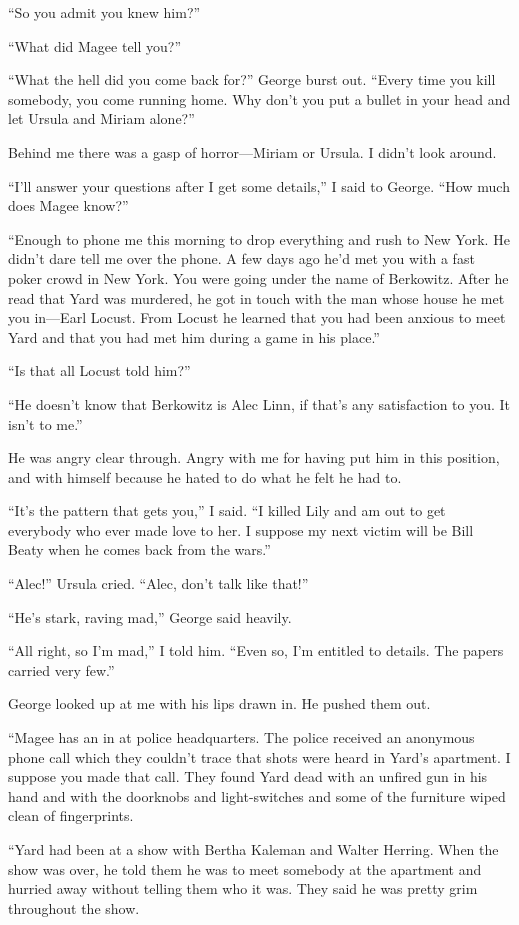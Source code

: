 \documentclass{novel}
\begin{document}
“So you admit you knew him?”

“What did Magee tell you?”

“What the hell did you come back for?” George burst out. “Every time you kill somebody, you come running home. Why don’t you put a bullet in your head and let Ursula and Miriam alone?”

Behind me there was a gasp of horror—Miriam or \mbox{Ursula}. I didn’t look around.

“I’ll answer your questions after I get some details,” I said to George. “How much does Magee know?”

“Enough to phone me this morning to drop everything and rush to New York. He didn’t dare tell me over the phone. A few days ago he’d met you with a fast poker crowd in New York. You were going under the name of Berkowitz. After he read that Yard was murdered, he got in touch with the man whose house he met you in—Earl Locust. From Locust he learned that you had been anxious to meet Yard and that you had met him during a game in his place.”

“Is that all Locust told him?”

“He doesn’t know that Berkowitz is Alec Linn, if that’s any satisfaction to you. It isn’t to me.”

He was angry clear through. Angry with me for having put him in this position, and with himself because he hated to do what he felt he had to.

“It’s the pattern that gets you,” I said. “I killed Lily and am out to get everybody who ever made love to her. I suppose my next victim will be Bill Beaty when he comes back from the wars.”

“Alec!” Ursula cried. “Alec, don’t talk like that!”

“He’s stark, raving mad,” George said heavily.

“All right, so I’m mad,” I told him. “Even so, I’m entitled to details. The papers carried very few.”

George looked up at me with his lips drawn in. He pushed them out. 

“Magee has an in at police headquarters. The police received an anonymous phone call which they couldn’t trace that shots were heard in Yard’s apartment. I suppose you made that call. They found Yard dead with an unfired gun in his hand and with the doorknobs and light-switches and some of the furniture wiped clean of fingerprints. 

“Yard had been at a show with Bertha Kaleman and Walter Herring. When the show was over, he told them he was to meet somebody at the apartment and hurried away without telling them who it was. They said he was pretty grim throughout the show. 
\end{document}
